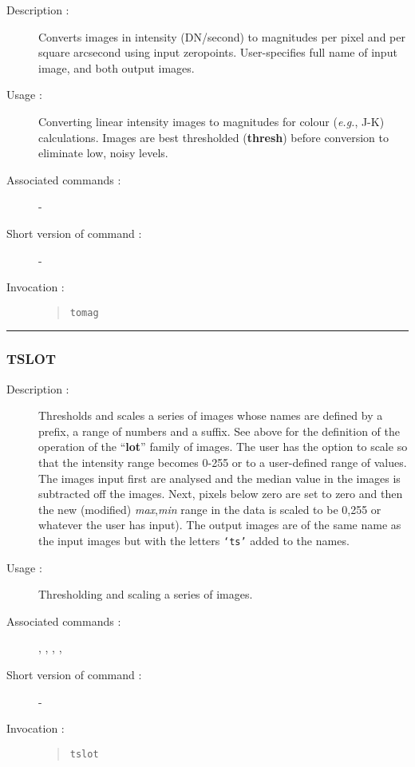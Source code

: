 \begin{description}

\item[Description :] Converts images in intensity (DN/second) to
magnitudes per pixel and per square arcsecond using input zeropoints.
User-specifies full name of input image, and both output images.

\item[Usage :] Converting linear intensity images to
magnitudes for colour (\emph{e.g.}, J-K) calculations.  Images are best
thresholded ({\bf thresh}) before conversion to eliminate low, noisy levels.

\item[Associated commands :] -
\item[Short version of command :] -
\item[Invocation :]

\begin{quote}{\tt  tomag }\end{quote}

\end{description}

\hrule 
\subsubsection*{\label{TSLOT}TSLOT}

\begin{description}

\item[Description :] Thresholds and scales a series of images whose
names are defined by a prefix, a range of numbers and a suffix. See
above for the definition of the operation of the ``{\bf lot}'' family
of images.  The user has the option to scale so that the intensity
range becomes 0-255 or to a user-defined range of values.  The images
input first are analysed and the median value in the images is
subtracted off the images. Next, pixels below zero are set to zero and
then the new (modified) {\it max},{\it min} range in the data is scaled
to be 0,255 or whatever the user has input).  The output images are of
the same name as the input images but with the letters {\tt `ts'} added to
the names.

\item[Usage :] Thresholding and scaling a series of images.

\item[Associated commands :] {\tt {}}, 
{\tt {}}, {\tt {}}, 
{\tt {}}, {\tt {}}

\item[Short version of command :] -
\item[Invocation :]

\begin{quote}{\tt tslot }\end{quote}

\end{description}


